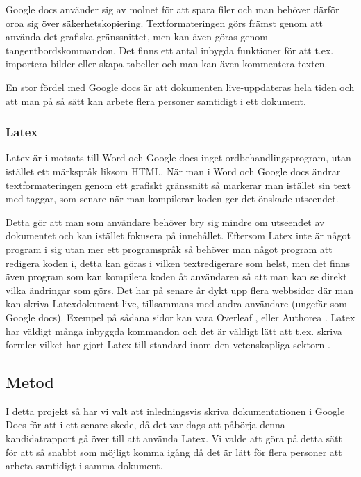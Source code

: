 Google docs använder sig av molnet för att spara filer och man behöver därför oroa sig över säkerhetskopiering. Textformateringen görs främst genom att använda det grafiska gränssnittet, men kan även göras genom tangentbordskommandon. Det finns ett antal inbygda funktioner för att t.ex. importera bilder eller skapa tabeller och man kan även kommentera texten.

En stor fördel med Google docs är att dokumenten live-uppdateras hela tiden och att man på så sätt kan arbete flera personer samtidigt i ett dokument.

\subsubsection{Latex}
Latex är i motsats till Word och Google docs inget ordbehandlingsprogram, utan istället ett märkspråk liksom HTML. När man i Word och Google docs ändrar textformateringen genom ett grafiskt gränssnitt så markerar man istället sin text med taggar, som senare när man kompilerar koden ger det önskade utseendet. 

	
Detta gör att man som användare behöver bry sig mindre om utseendet av dokumentet och kan istället fokusera på innehållet. Eftersom Latex inte är något program i sig utan mer ett programspråk så behöver man något program att redigera koden i, detta kan göras i vilken textredigerare som helst, men det finns även program som kan kompilera koden åt användaren så att man kan se direkt vilka ändringar som görs. Det har på senare år dykt upp flera webbsidor där man kan skriva Latexdokument live, tillsammans med andra användare (ungefär som Google docs). Exempel på sådana sidor kan vara Overleaf \cite{overleaf}, eller Authorea \cite{authorea}. Latex har väldigt många inbyggda kommandon och det är väldigt lätt att t.ex. skriva formler vilket har gjort Latex till standard inom den vetenskapliga sektorn \cite{latex_standard}.


\subsection{Metod}
I detta projekt så har vi valt att inledningsvis skriva dokumentationen i Google Docs för att i ett senare skede, då det var dags att påbörja denna kandidatrapport gå över till att använda Latex. Vi valde att göra på detta sätt för att så snabbt som möjligt komma igång då det är lätt  för flera personer att arbeta samtidigt i samma dokument.

